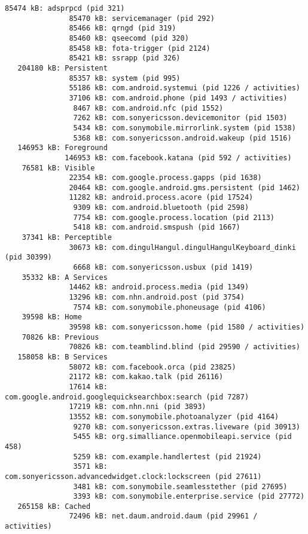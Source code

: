 \begin{lstlisting}[frame=single]
               85474 kB: adsprpcd (pid 321)
               85470 kB: servicemanager (pid 292)
               85466 kB: qrngd (pid 319)
               85460 kB: qseecomd (pid 320)
               85458 kB: fota-trigger (pid 2124)
               85421 kB: ssrapp (pid 326)
   204180 kB: Persistent
               85357 kB: system (pid 995)
               55186 kB: com.android.systemui (pid 1226 / activities)
               37106 kB: com.android.phone (pid 1493 / activities)
                8467 kB: com.android.nfc (pid 1552)
                7262 kB: com.sonyericsson.devicemonitor (pid 1503)
                5434 kB: com.sonymobile.mirrorlink.system (pid 1538)
                5368 kB: com.sonyericsson.android.wakeup (pid 1516)
   146953 kB: Foreground
              146953 kB: com.facebook.katana (pid 592 / activities)
    76581 kB: Visible
               22354 kB: com.google.process.gapps (pid 1638)
               20464 kB: com.google.android.gms.persistent (pid 1462)
               11282 kB: android.process.acore (pid 17524)
                9309 kB: com.android.bluetooth (pid 2598)
                7754 kB: com.google.process.location (pid 2113)
                5418 kB: com.android.smspush (pid 1667)
    37341 kB: Perceptible
               30673 kB: com.dingulHangul.dingulHangulKeyboard_dinki (pid 30399)
                6668 kB: com.sonyericsson.usbux (pid 1419)
    35332 kB: A Services
               14462 kB: android.process.media (pid 1349)
               13296 kB: com.nhn.android.post (pid 3754)
                7574 kB: com.sonymobile.phoneusage (pid 4106)
    39598 kB: Home
               39598 kB: com.sonyericsson.home (pid 1580 / activities)
    70826 kB: Previous
               70826 kB: com.teamblind.blind (pid 29590 / activities)
   158058 kB: B Services
               58072 kB: com.facebook.orca (pid 23825)
               21172 kB: com.kakao.talk (pid 26116)
               17614 kB: com.google.android.googlequicksearchbox:search (pid 7287)
               17219 kB: com.nhn.nni (pid 3893)
               13552 kB: com.sonymobile.photoanalyzer (pid 4164)
                9270 kB: com.sonyericsson.extras.liveware (pid 30913)
                5455 kB: org.simalliance.openmobileapi.service (pid 458)
                5259 kB: com.example.handlertest (pid 21924)
                3571 kB: com.sonyericsson.advancedwidget.clock:lockscreen (pid 27611)
                3481 kB: com.sonymobile.seamlesstether (pid 27695)
                3393 kB: com.sonymobile.enterprise.service (pid 27772)
   265158 kB: Cached
               72496 kB: net.daum.android.daum (pid 29961 / activities)

\end{lstlisting}
